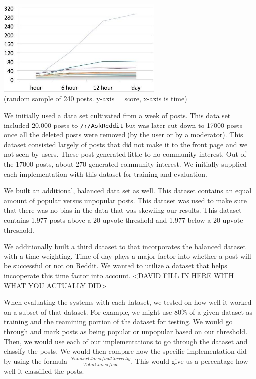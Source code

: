 \documentclass{acm_proc_article-sp}
\begin{document}
\includegraphics[width=8cm]{evaluation.jpg}\\
(random sample of 240 posts. y-axis = score, x-axis is time)

We initially used a data set cultivated from a week of posts. This data set included 20,000 posts to \texttt{/r/AskReddit} but was later cut down to 17000 posts once all the deleted posts were removed (by the user or by a moderator). This dataset consisted largely of posts that did not make it to the front page and we not seen by users. These post generated little to no community interest. Out of the 17000 posts, about 270 generated community interest. We initially supplied each implementation with this dataset for training and evaluation.

We built an additional, balanced data set as well. This dataset contains an equal amount of popular versus unpopular posts. This dataset was used to make sure that there was no bias in the data that was skewiing our results. This dataset contains 1,977 posts above a 20 upvote threshold and 1,977 below a 20 upvote threshold.

We additionally built a third dataset to that incorporates the balanced dataset with a time weighting. Time of day plays a major factor into whether a post will be successful or not on Reddit. We wanted to utilize a dataset that helps incooperate this time factor into account. 
<DAVID FILL IN HERE WITH WHAT YOU ACTUALLY DID>

When evaluating the systems with each dataset, we tested on how well it worked on a subset of that dataset. For example, we might use 80\% of a given dataset as training and the reamining portion of the dataset for testing. We would go through and mark posts as being popular or unpopular based on our threshold. Then, we would use each of our implementations to go through the dataset and classify the posts. We would then compare how the specific implementation did by using the formula $\frac{Number Classified Correctly}{Total Classified}$. This would give us a percentage how well it classified the posts.
\end{document}
